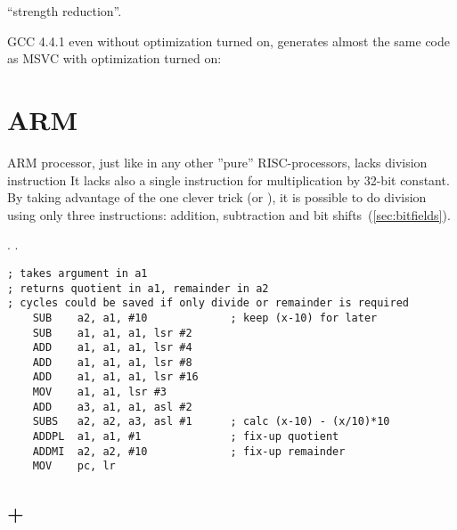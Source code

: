 ``strength reduction''.

{GCC 4.4.1 even without optimization turned on, generates almost the same code as MSVC with optimization turned on:}



\section{ARM}

{ARM processor, just like in any other ''pure'' RISC-processors, lacks division instruction
It lacks also a single instruction for multiplication by 32-bit constant.}
{By taking advantage of the one clever trick (or ), it is possible to do division using only three instructions: addition,
subtraction and bit shifts}~(\ref{sec:bitfields}).

\cite[3.3 Division by a Constant]{ARM:1994}.
.

\begin{lstlisting}
; takes argument in a1
; returns quotient in a1, remainder in a2
; cycles could be saved if only divide or remainder is required
    SUB    a2, a1, #10             ; keep (x-10) for later
    SUB    a1, a1, a1, lsr #2
    ADD    a1, a1, a1, lsr #4
    ADD    a1, a1, a1, lsr #8
    ADD    a1, a1, a1, lsr #16
    MOV    a1, a1, lsr #3
    ADD    a3, a1, a1, asl #2
    SUBS   a2, a2, a3, asl #1      ; calc (x-10) - (x/10)*10
    ADDPL  a1, a1, #1              ; fix-up quotient
    ADDMI  a2, a2, #10             ; fix-up remainder
    MOV    pc, lr
\end{lstlisting}

\subsection{\OptimizingXcode + \ARMMode}

